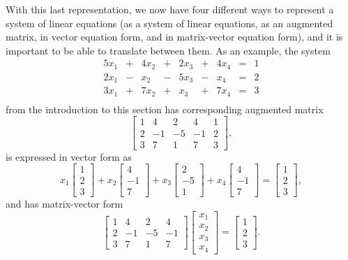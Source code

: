 With this last representation, we now have four different ways to represent a system of linear equations (as a system of linear equations, as an augmented matrix, in vector equation form, and in matrix-vector equation form), and it is important to be able to translate between them. As an example, the system
\begin{alignat*}{5}
x_1 		&{}+{} 	&{4}x_2 	&{}+{}	&{2}x_3 	&{}+{}	&{4}x_4	&{}={}	&1 \\
{2}x_1 	&{}-{} 	&{}x_2 		&{}-{}	&{5}x_3 	&{}-{}	&{}x_4	&{}={}	&2 \\
{3}x_1 	&{}+{} 	&{7}x_2 	&{}+{}	&{}x_3 		&{}+{}	&{7}x_4	&{}={}	&3 \\
\end{alignat*}
from the introduction to this section has corresponding augmented matrix
\[\left[ \begin{array}{crrr|c} 1&4&2&4&1 \\ 2&-1&-5&-1&2 \\ 3&7&1&7&3 \end{array} \right],\]
is expressed in vector form as 
\[x_1\left[ \begin{array}{c} 1\\2\\3 \end{array} \right] + x_2\left[ \begin{array}{r} 4\\-1\\7 \end{array} \right] + x_3\left[ \begin{array}{r} 2\\-5\\1 \end{array} \right] + x_4\left[ \begin{array}{r} 4\\-1\\7 \end{array} \right]= \left[ \begin{array}{c} 1\\2\\3 \end{array} \right],\]
and has matrix-vector form
\[\left[ \begin{array}{crrr} 1&4&2&4 \\ 2&-1&-5&-1 \\ 3&7&1&7 \end{array} \right] \left[ \begin{array}{c} x_1 \\x_2 \\ x_3 \\ x_4 \end{array} \right] = \left[ \begin{array}{c} 1 \\ 2 \\ 3 \end{array} \right].\]


